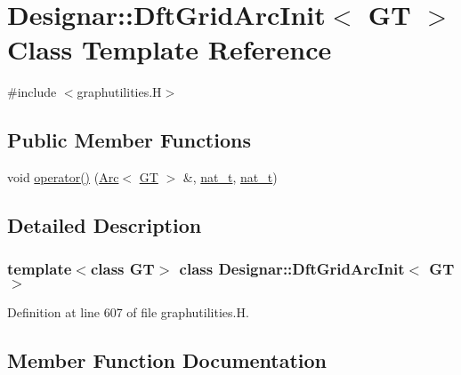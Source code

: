 \hypertarget{class_designar_1_1_dft_grid_arc_init}{}\section{Designar\+:\+:Dft\+Grid\+Arc\+Init$<$ GT $>$ Class Template Reference}
\label{class_designar_1_1_dft_grid_arc_init}


{\ttfamily \#include $<$graphutilities.\+H$>$}

\subsection*{Public Member Functions}
\begin{DoxyCompactItemize}
\item 
void \hyperlink{class_designar_1_1_dft_grid_arc_init_aa454d871716af2f3a9c7c0758b8f8af4}{operator()} (\hyperlink{namespace_designar_a3f55fb5513d62ff47cbc8f72b8e95d6f}{Arc}$<$ \hyperlink{demo-buildgraph_8_c_a3001c40d2c31ca87ed96cd7d1334a55e}{GT} $>$ \&, \hyperlink{namespace_designar_aa72662848b9f4815e7bf31a7cf3e33d1}{nat\+\_\+t}, \hyperlink{namespace_designar_aa72662848b9f4815e7bf31a7cf3e33d1}{nat\+\_\+t})
\end{DoxyCompactItemize}


\subsection{Detailed Description}
\subsubsection*{template$<$class GT$>$\newline
class Designar\+::\+Dft\+Grid\+Arc\+Init$<$ G\+T $>$}



Definition at line 607 of file graphutilities.\+H.



\subsection{Member Function Documentation}
\mbox{\label{class_designar_1_1_dft_grid_arc_init_aa454d871716af2f3a9c7c0758b8f8af4}} 
